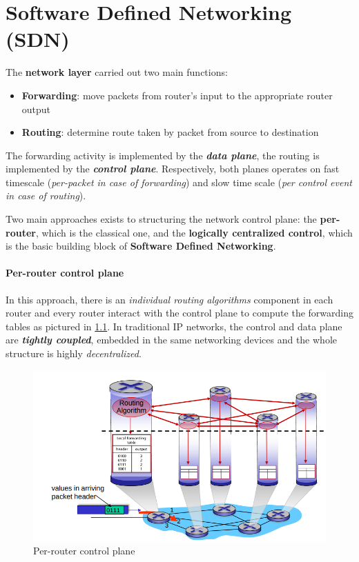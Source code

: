 \documentclass[10pt,a4paper]{report}
\theoremstyle{definition}
\begin{document}
\chapter{Software Defined Networking (SDN)}
\label{sec:sdn---software-defined-networking}
The \textbf{network layer} carried out two main functions:
\begin{itemize}
	\item 
	\textbf{Forwarding}: move packets from router's input to the appropriate router output
	\item 
	\textbf{Routing}: determine route taken by packet from source to destination

\end{itemize}
	The forwarding activity is implemented by the \textit{\textbf{data plane}}, the routing is implemented by the \textit{\textbf{control plane}}. Respectively, both planes operates on fast timescale (\textit{per-packet in case of forwarding}) and slow time scale (\textit{per control event in case of routing}).

Two main approaches exists to structuring the network control plane: the \textbf{per-router}, which is the classical one, and the \textbf{logically centralized control}, which is the basic building block of \textbf{Software Defined Networking}.

\subsubsection{Per-router control plane}\label{sec:per-router-control-plane}
In this approach, there is an \textit{individual routing algorithms} component in each router and every router interact with the control plane to compute the forwarding tables as pictured in \ref{per-route-control-plane}.
In traditional IP networks, the control and data plane are \textit{\textbf{tightly coupled}}, embedded in the same networking devices and the whole structure is highly \textit{decentralized}. 
\begin{figure}[h]
	\centering\includegraphics[scale=0.50]{images/Pasted image 20230322105517.png}
	\caption{Per-router control plane}
\label{per-route-control-plane}
\end{figure}
\end{document}
